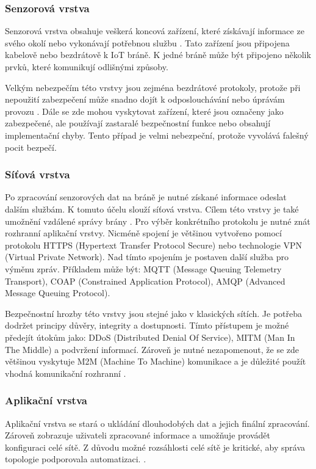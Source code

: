  \subsubsection{Senzorová vrstva}
 Senzorová vrstva obsahuje veškerá koncová zařízení, které získávají informace ze svého
 okolí nebo vykonávají potřebnou službu \cite{secFramework}. Tato zařízení jsou připojena
 kabelově nebo bezdrátově k IoT bráně. K jedné bráně může být připojeno několik
 prvků, které komunikují odlišnými způsoby.
 
 Velkým nebezpečím této vrstvy jsou zejména bezdrátové protokoly, protože při nepoužití
 zabezpečení může snadno dojít k odposlouchávání nebo úprávám provozu \cite{iotSurvey}.
 Dále se zde mohou vyskytovat zařízení, které jsou označeny jako zabezpečené, 
 ale používají zastaralé bezpečnostní funkce nebo obsahují implementační chyby. 
 Tento případ je velmi nebezpeční, protože vyvolává falešný pocit bezpečí.
 
 \subsubsection{Síťová vrstva}
 Po zpracování senzorových dat na bráně je nutné získané informace odeslat dalším
 službám. K tomuto účelu slouží síťová vrstva. Cílem této vrstvy je také umožnění 
 vzdálené správy brány \cite{secFramework}. Pro výběr konkrétního protokolu je 
 nutné znát rozhranní aplikační vrstvy. Nicméně spojení je většinou vytvořeno
 pomocí protokolu HTTPS (Hypertext Transfer Protocol Secure) nebo technologie
 VPN (Virtual Private Network). Nad tímto spojením je postaven další služba pro 
 výměnu zpráv. Příkladem může být: MQTT (Message Queuing Telemetry Transport),
 COAP (Constrained Application Protocol),
 AMQP (Advanced Message Queuing Protocol).
 
 Bezpečnostní hrozby této vrstvy jsou stejné jako v klasických sítích. Je potřeba
 dodržet principy důvěry, integrity a dostupnosti. Tímto přístupem je možné
 předejít útokům jako: DDoS (Distributed Denial Of Service),
 MITM (Man In The Middle) a podvržení informací. Zároveň je nutné
 nezapomenout, že se zde většinou vyskytuje M2M (Machine To Machine)
 komunikace a je důležité použít 
 vhodná komunikační rozhranní \cite{iotSurvey}.
 
 \subsubsection{Aplikační vrstva}
 Aplikační vrstva se stará o ukládání dlouhodobých dat a jejich finální zpracování. 
 Zároveň zobrazuje uživateli zpracované informace a umožňuje provádět konfiguraci
 celé sítě. Z důvodu možné rozsáhlosti celé sítě je kritické, aby správa
 topologie podporovala automatizaci. \cite{secFramework}.
 
